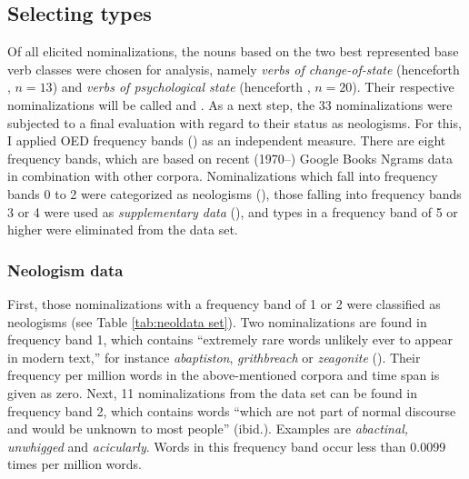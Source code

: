 \subsection{Selecting types}
\label{sec:meth-revis-select}

Of all elicited nominalizations, the nouns based on the two best represented base verb classes were chosen for analysis, namely \textit{verbs of change-of-state} (henceforth , $n=13$) and \textit{verbs of psychological state} (henceforth , $n=20$). Their respective nominalizations will be called  and . As a next step, the 33 nominalizations were subjected to a final evaluation with regard to their status as neologisms. For this, I applied OED frequency bands () as an independent measure. There are eight frequency bands, which are based on recent (1970–) Google Books Ngrams data in combination with other corpora. Nominalizations which fall into frequency bands 0 to 2 were categorized as neologisms (), those falling into frequency bands 3 or 4 were used as \textit{supplementary data} (), and types in a frequency band of 5 or higher were eliminated from the data set. 

\subsubsection{Neologism data}
\label{sec:meth-revis-select-neo}

First, those nominalizations with a frequency band of 1 or 2 were classified as neologisms (see Table \ref{tab:neoldata set}). 
Two nominalizations are found in frequency band 1, which contains ``extremely rare words unlikely ever to appear in modern text,'' for instance \textit{abaptiston}, \textit{grithbreach} or \textit{zeagonite} (). Their frequency per million words in the above-mentioned corpora and time span is given as zero.  
Next, 11 nominalizations from the data set can be found in frequency band 2, which contains words ``which are not part of normal discourse and would be unknown to most people'' (ibid.). Examples are \textit{abactinal, unwhigged} and \textit{acicularly}. Words in this frequency band occur less than 0.0099 times per million words. 

